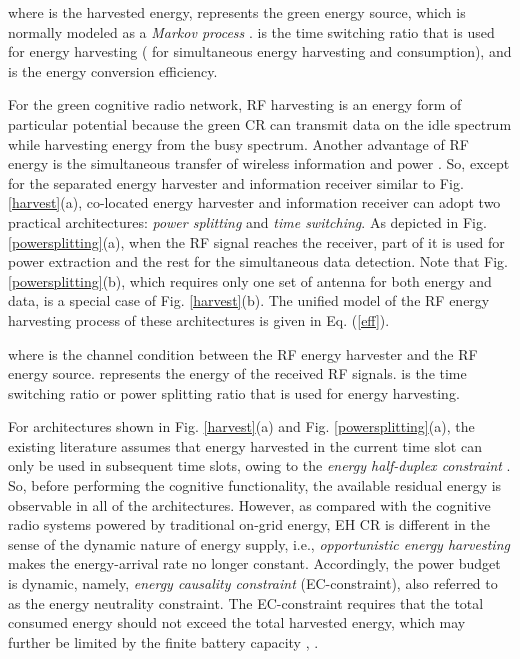 \documentclass[journal,12pt,onecolumn]{IEEEtran}
\begin{document}
where  is the harvested energy,  represents the green energy source, which is normally modeled as a \emph{Markov process} \cite{6710085}.  is the time switching ratio that is used for energy harvesting ( for simultaneous energy harvesting and consumption), and  is the energy conversion efficiency.

For the green cognitive radio network, RF harvesting is an energy form of particular potential because the green CR can transmit data on the idle spectrum while harvesting energy from the busy spectrum. Another advantage of RF energy is the simultaneous transfer of wireless information and power \cite{6489506}. So, except for the separated energy harvester and information receiver similar to Fig. \ref{harvest}(a), co-located energy harvester and information receiver can adopt two practical architectures: \emph{power splitting} and \emph{time switching}. As depicted in Fig. \ref{powersplitting}(a), when the RF signal reaches the receiver, part of it is used for power extraction and the rest for the simultaneous data detection. Note that Fig. \ref{powersplitting}(b), which requires only one set of antenna for both energy and data, is a special case of Fig. \ref{harvest}(b). The unified model of the RF energy harvesting process of these architectures is given in Eq. (\ref{eff}).


where  is the channel condition between the RF energy harvester and the RF energy source.  represents the energy of the received RF signals.  is the time switching ratio or power splitting ratio that is used for energy harvesting.

For architectures shown in Fig. \ref{harvest}(a) and Fig. \ref{powersplitting}(a), the existing literature assumes that energy harvested in the current time slot can only be used in subsequent time slots, owing to the \emph{energy half-duplex constraint} \cite{6449245}. So, before performing the cognitive functionality, the available residual energy is observable in all of the architectures. However, as compared with the cognitive radio systems powered by traditional on-grid energy, EH CR is different in the sense of the dynamic nature of energy supply, i.e., \emph{opportunistic energy harvesting} makes the energy-arrival rate no longer constant. Accordingly, the power budget is dynamic, namely, \emph{energy causality constraint} (EC-constraint), also referred to as the energy neutrality constraint. The EC-constraint requires that the total consumed energy should not exceed the total harvested energy, which may further be limited by the finite battery capacity \cite{5522465}, \cite{energyCausality}. 
\end{document}
